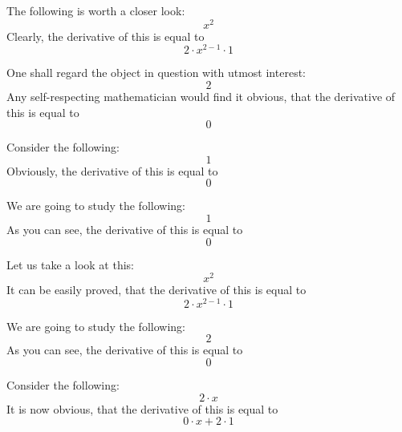 \documentclass{article}
\begin{document}
The following is worth a closer look:
\begin{equation}
x ^{2 } 
\end{equation}
Clearly, the derivative of this is equal to
\begin{equation}
2 \cdot x ^{2 - 1 } \cdot 1 
\end{equation}

One shall regard the object in question with utmost interest:
\begin{equation}
2 
\end{equation}
Any self-respecting mathematician would find it obvious, that the derivative of this is equal to
\begin{equation}
0 
\end{equation}

Consider the following:
\begin{equation}
1 
\end{equation}
Obviously, the derivative of this is equal to
\begin{equation}
0 
\end{equation}

We are going to study the following:
\begin{equation}
1 
\end{equation}
As you can see, the derivative of this is equal to
\begin{equation}
0 
\end{equation}

Let us take a look at this:
\begin{equation}
x ^{2 } 
\end{equation}
It can be easily proved, that the derivative of this is equal to
\begin{equation}
2 \cdot x ^{2 - 1 } \cdot 1 
\end{equation}

We are going to study the following:
\begin{equation}
2 
\end{equation}
As you can see, the derivative of this is equal to
\begin{equation}
0 
\end{equation}

Consider the following:
\begin{equation}
2 \cdot x 
\end{equation}
It is now obvious, that the derivative of this is equal to
\begin{equation}
0 \cdot x + 2 \cdot 1 
\end{equation}
\end{document}
